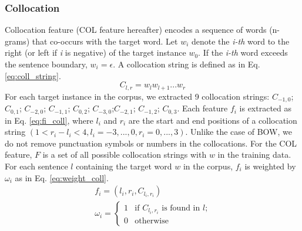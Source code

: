 \documentclass[english]{jnlp_1.4}
\begin{document}
\subsubsection{Collocation}
Collocation feature  (COL feature hereafter) encodes a sequence of words (n-grams) that co-occurs with the target word. 
Let $w_{i}$ denote the \textit{i-th} word to the right (or left if \textit{i} is negative) of the target instance $w_{0}$.
If the \textit{i-th} word exceeds the sentence boundary, $w_{i}=\epsilon$. 
A collocation string is defined as in Eq. \eqref{eq:coll_string}.
\begin{equation}\label{eq:coll_string}
C_{l,r} = w_{l}w_{l+1}...w_{r} 
\end{equation}
For each target instance in the corpus, we extracted 9 collocation strings:
$ C_{-1,0}$; $C_{0,1}$;
$ C_{-2,0}$; $C_{-1,1}$; $C_{0,2}$;
$C_{-3,0}$;$ C_{-2,1}$; $C_{-1,2}$; $C_{0,3} $.
Each feature $f_{i}$ is extracted as in Eq. \eqref{eq:fi_coll}, where $l_{i}$ and $r_{i}$ are the start and end positions of a collocation string $(1<r_{i}-l_{i}<4, l_{i}=-3,...,0, r_{i}=0,...,3)$. 
Unlike the case of BOW, we do not remove punctuation symbols or numbers in the collocations. 
For the COL feature, $F$ is a set of all possible collocation strings with $w$ in the training data. For each sentence $l$ containing the target word $w$ in the corpus, $f_i$ is weighted by $\omega_i$ as in Eq. \eqref{eq:weight_coll}. 
\begin{gather}
 \label{eq:fi_coll}
f_{i} = (l_{i},r_{i},C_{l_{i},r_{i}}) \\
 \label{eq:weight_coll}
 \omega_{i} = \left \{ \begin{array}{ll} 1 & \mbox{if $C_{l_{i},r_{i}}$ is found in $l$;}\\ 0 & \mbox{otherwise} \end{array} \right.
\end{gather}
\end{document}
